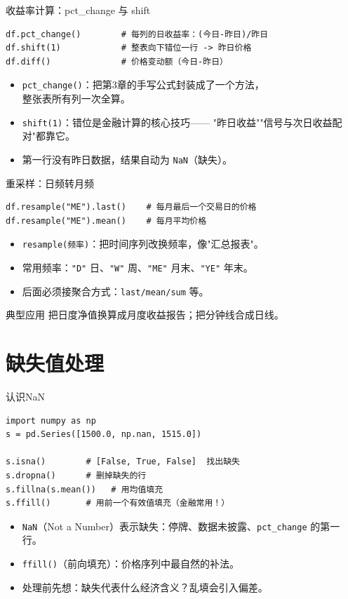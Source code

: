 \documentclass[9pt]{ctexbeamer}
\begin{document}
\begin{frame}[fragile]{收益率计算：pct\_change 与 shift}
	\begin{lstlisting}
df.pct_change()        # 每列的日收益率：(今日-昨日)/昨日
df.shift(1)            # 整表向下错位一行 -> 昨日价格
df.diff()              # 价格变动额（今日-昨日）
\end{lstlisting}
	\begin{itemize}
		\item \texttt{pct\_change()}：把第3章的手写公式封装成了一个方法，\\
			整张表所有列\alert{一次全算}。
		\item \texttt{shift(1)}：错位是金融计算的核心技巧——
			"昨日收益""信号与次日收益配对"都靠它。
		\item 第一行没有昨日数据，结果自动为 \texttt{NaN}（缺失）。
	\end{itemize}
\end{frame}

\begin{frame}[fragile]{重采样：日频转月频}
	\begin{lstlisting}
df.resample("ME").last()    # 每月最后一个交易日的价格
df.resample("ME").mean()    # 每月平均价格
\end{lstlisting}
	\begin{itemize}
		\item \texttt{resample(频率)}：把时间序列改换频率，像"汇总报表"。
		\item 常用频率：\texttt{"D"} 日、\texttt{"W"} 周、\texttt{"ME"} 月末、\texttt{"YE"} 年末。
		\item 后面必须接聚合方式：\texttt{last/mean/sum} 等。
	\end{itemize}
	\begin{exampleblock}{典型应用}
		把日度净值换算成月度收益报告；把分钟线合成日线。
	\end{exampleblock}
\end{frame}


\section{缺失值处理}

\begin{frame}[fragile]{认识NaN}
	\begin{lstlisting}
import numpy as np
s = pd.Series([1500.0, np.nan, 1515.0])

s.isna()        # [False, True, False]  找出缺失
s.dropna()      # 删掉缺失的行
s.fillna(s.mean())   # 用均值填充
s.ffill()       # 用前一个有效值填充（金融常用！）
\end{lstlisting}
	\begin{itemize}
		\item \texttt{NaN}（Not a Number）表示缺失：停牌、数据未披露、\texttt{pct\_change} 的第一行。
		\item \texttt{ffill()}（前向填充）：价格序列中最自然的补法。
		\item 处理前先想：缺失代表什么经济含义？乱填会引入偏差。
	\end{itemize}
\end{frame}
\end{document}
